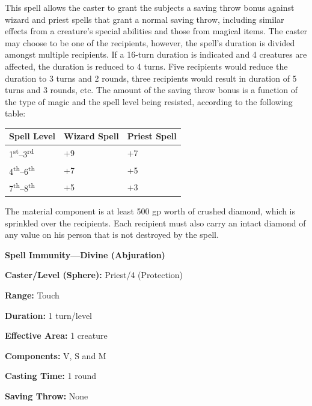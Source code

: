 \begin{multicols}{2}
This spell allows the caster to grant the subjects a saving throw bonus against wizard and priest spells that grant a normal saving throw, including similar effects from a creature's special abilities and those from magical items.  The caster may choose to be one of the recipients, however, the spell's duration is divided amongst multiple recipients.  If a 16-turn duration is indicated and 4 creatures are affected, the duration is reduced to 4 turns.  Five recipients would reduce the duration to 3 turns and 2 rounds, three recipients would result in duration of 5 turns and 3 rounds, etc.  The amount of the saving throw bonus is a function of the type of magic and the spell level being resisted, according to the following table:

\noindent
\begin{tabular}{|p{}|p{}|p{}|}
\hline
Spell Level	& Wizard Spell	& Priest Spell \\
\hline\hline
\rowcolor[gray]{.9}1\textsuperscript{st}--3\textsuperscript{rd}	& +9	& +7 \\
4\textsuperscript{th}--6\textsuperscript{th}	& +7	& +5 \\
\rowcolor[gray]{.9}7\textsuperscript{th}--8\textsuperscript{th}	& +5	& +3 \\
\hline
\end{tabular}

The material component is at least 500 gp worth of crushed diamond, which is sprinkled over the recipients.  Each recipient must also carry an intact diamond of any value on his person that is not destroyed by the spell.

\vspace{1em}

\noindent
\begin{minipage}{\columnwidth}

\noindent \textbf{Spell Immunity---Divine (Abjuration)}

\noindent \textbf{Caster/Level (Sphere):} Priest/4 (Protection)

\noindent \textbf{Range:} Touch

\noindent \textbf{Duration:} 1 turn/level

\noindent \textbf{Effective Area:} 1 creature

\noindent \textbf{Components:} V, S and M

\noindent \textbf{Casting Time:} 1 round

\noindent \textbf{Saving Throw:} None


\end{minipage}
\end{multicols}

